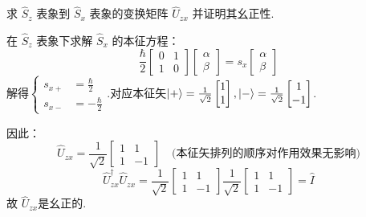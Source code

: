 \begin{question}
    求 $\hat{S}_z$ 表象到 $\hat{S}_x$ 表象的变换矩阵 $\hat{U}_{zx}$ 并证明其幺正性.
\end{question}
\begin{solution}
    在 $\hat{S}_z$ 表象下求解 $\hat{S}_x$ 的本征方程：
    $$\frac{\hbar}{2} \begin{bmatrix} 0 & 1 \\ 1 & 0 \end{bmatrix} \begin{bmatrix} \alpha \\ \beta \end{bmatrix} = s_x \begin{bmatrix} \alpha \\ \beta \end{bmatrix}$$
    解得$\begin{cases}
        s_{x+} &= \frac{\hbar}{2} \\
        s_{x-} &= -\frac{\hbar}{2}
    \end{cases}$.对应本征矢$\ket{+} = \frac{1}{\sqrt{2}} \begin{bmatrix} 1 \\ 1 \end{bmatrix},\ket{-} = \frac{1}{\sqrt{2}} \begin{bmatrix} 1 \\ -1 \end{bmatrix}$.

    因此：
    $$\hat{U}_{zx} = \frac{1}{\sqrt{2}} \begin{bmatrix} 1 & 1 \\ 1 & -1 \end{bmatrix} \quad \text{(本征矢排列的顺序对作用效果无影响)}$$
    $$\hat{U}_{zx}^\dagger \hat{U}_{zx} = \frac{1}{\sqrt{2}} \begin{bmatrix} 1 & 1 \\ 1 & -1 \end{bmatrix} \frac{1}{\sqrt{2}} \begin{bmatrix} 1 & 1 \\ 1 & -1 \end{bmatrix} = \hat{I}$$
    故 $\hat{U}_{zx}$是幺正的.
\end{solution}
